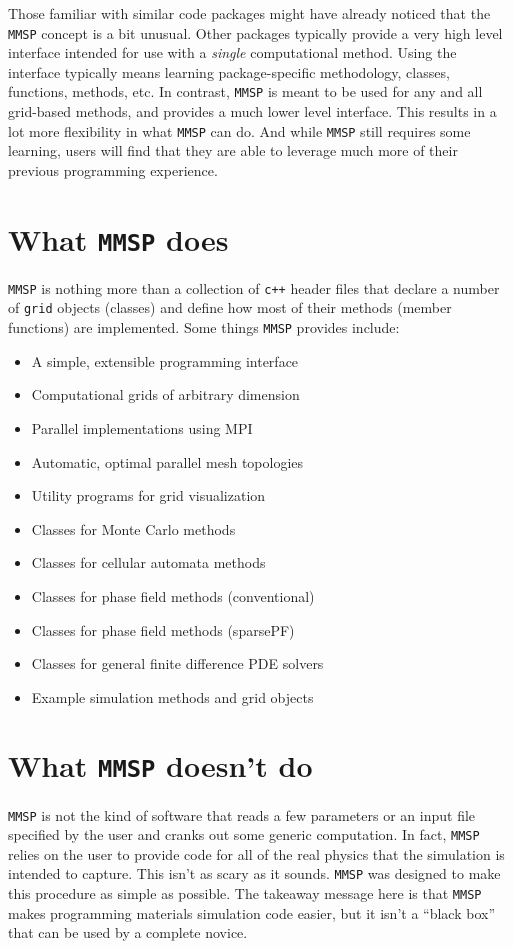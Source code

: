 Those familiar with similar code packages might have already noticed that the {\tt MMSP} concept is a bit unusual. Other packages typically provide a very high level interface intended for use with a {\em single} computational method.  Using the interface typically means learning package-specific methodology, classes, functions, methods, etc.  In contrast, {\tt MMSP} is meant to be used for any and all grid-based methods, and provides a much lower level interface.  This results in a lot more flexibility in what {\tt MMSP} can do.  And while {\tt MMSP} still requires some learning, users will find that they are able to leverage much more of their previous programming experience.

\section{What {\tt MMSP} does}
{\tt MMSP} is nothing more than a collection of {\tt c++} header files that declare a number of {\tt grid} objects (classes) and define how most of their methods (member functions) are implemented.  Some things {\tt MMSP} provides include:
\begin{itemize}
\item A simple, extensible programming interface
\item Computational grids of arbitrary dimension
\item Parallel implementations using MPI
\item Automatic, optimal parallel mesh topologies
\item Utility programs for grid visualization
\item Classes for Monte Carlo methods
\item Classes for cellular automata methods 
\item Classes for phase field methods (conventional)
\item Classes for phase field methods (sparsePF)
\item Classes for general finite difference PDE solvers
\item Example simulation methods and grid objects
\end{itemize}

\section{What {\tt MMSP} doesn't do}
{\tt MMSP} is not the kind of software that reads a few parameters or an input file specified by the user and cranks out some generic computation. In fact, {\tt MMSP} relies on the user to provide code for all of the real physics that the simulation is intended to capture. This isn't as scary as it sounds. {\tt MMSP} was designed to make this procedure as simple as possible. The takeaway message here is that {\tt MMSP} makes programming materials simulation code easier, but it isn't a ``black box'' that can be used by a complete novice.

